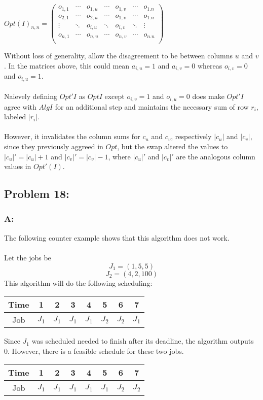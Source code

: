 \documentclass[12pt]{article}
\begin{document}
\begin{center}
$
Opt(I)_{n,n} = 
    \begin{pmatrix}
    o_{1,1} & \cdots & o_{1,u} & \cdots & o_{1,v} & \cdots & o_{1.n} \\
    o_{2,1} & \cdots & o_{2,u} & \cdots & o_{1,v} & \cdots & o_{1.n} \\
    \vdots  & \ddots & o_{i,u} & \ddots & o_{i,v} & \ddots & \vdots \\ 
    o_{n,1} & \cdots & o_{n,u} & \cdots & o_{n,v} & \cdots & o_{n.n} \\
    \end{pmatrix}
$ 
\end{center}
Without loss of generality, allow the disagreement to be between columns
$u$ and $v$.  In the matrices above, this could mean $a_{i,u}=1$ and
$a_{i,v}=0$ whereas $o_{i,v}=0$ and $o_{i,u}=1$.\\\\
Naievely defining $Opt'{I}$ as $Opt{I}$ except $o_{i,v}=1$ and $o_{i,u}=0$
does make $Opt'{I}$ agree with $Alg{I}$ for an additional step and maintains
the necessary sum of row $r_i$, labeled $|r_i|$.\\\\
However, it invalidates the
column sums for $c_u$ and $c_v$, respectively $|c_u|$ and $|c_v|$, since they
previously aggreed in $Opt$, but the swap altered the values to $|c_u|' = |c_u|+1$
and $|c_v|'=|c_v|-1$, where $|c_u|'$ and $|c_v|'$ are the analogous column values
in $Opt'(I)$.     
\subsection*{Problem 18:}
\subsubsection*{A:}
The following counter example shows that this algorithm does not work.\\\\
Let the jobs be
\[
J_1=(1,5,5)
\]
\[
J_2=(4,2,100)
\]
This algorithm will do the following scheduling:\\
\begin{center}
    \begin{tabular}{c|c|c|c|c|c|c|c}
    Time & 1 & 2 & 3 & 4 & 5 & 6 & 7 \\ \hline
    Job & $J_1$ & $J_1$ & $J_1$ & $J_1$ & $J_2$ & $J_2$ & $J_1$ \\
    \end{tabular}
\end{center}  
Since $J_1$ was scheduled needed to finish after its deadline, the algorithm
outputs $0$.  However, there is a feasible schedule for these two jobs.\\
\begin{center}
    \begin{tabular}{c|c|c|c|c|c|c|c}
    Time & 1 & 2 & 3 & 4 & 5 & 6 & 7 \\ \hline
    Job & $J_1$ & $J_1$ & $J_1$ & $J_1$ & $J_1$ & $J_2$ & $J_2$ \\
    \end{tabular}
\end{center}  
\end{document}
